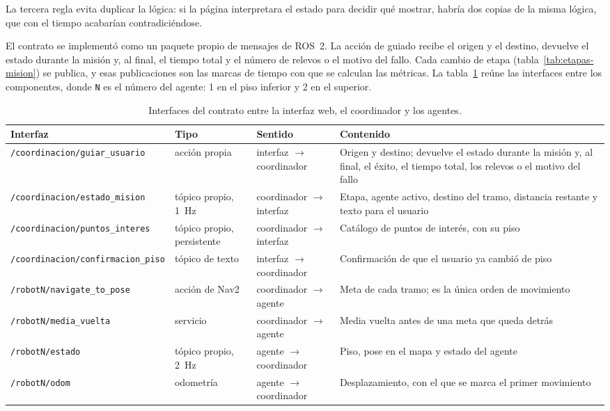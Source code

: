 La tercera regla evita duplicar la lógica: si la página interpretara el estado para decidir qué mostrar, habría dos copias de la misma lógica, que con el tiempo acabarían contradiciéndose.

El contrato se implementó como un paquete propio de mensajes de ROS~2. La acción
de guiado recibe el origen y el destino, devuelve el estado durante la misión y,
al final, el tiempo total y el número de relevos o el motivo del fallo. Cada
cambio de etapa (tabla~\ref{tab:etapas-mision}) se publica, y esas publicaciones
son las marcas de tiempo con que se calculan las métricas. La tabla~\ref{tab:contrato} reúne las interfaces entre los componentes, donde \texttt{N} es el número del agente: 1 en el piso inferior y 2 en el superior.

\begin{table}[H]
  \centering\footnotesize
  \caption{Interfaces del contrato entre la interfaz web, el coordinador y los agentes.}
  \label{tab:contrato}
  \begin{tabular}{@{}p{}p{}p{}p{}@{}}
    \toprule
    \textbf{Interfaz} & \textbf{Tipo} & \textbf{Sentido} & \textbf{Contenido} \\ \midrule
    \texttt{/coordinacion/guiar\_usuario} & acción propia & interfaz $\rightarrow$ coordinador & Origen y destino; devuelve el estado durante la misión y, al final, el éxito, el tiempo total, los relevos o el motivo del fallo \\ \addlinespace
    \texttt{/coordinacion/estado\_mision} & tópico propio, 1~Hz & coordinador $\rightarrow$ interfaz & Etapa, agente activo, destino del tramo, distancia restante y texto para el usuario \\ \addlinespace
    \texttt{/coordinacion/puntos\_interes} & tópico propio, persistente & coordinador $\rightarrow$ interfaz & Catálogo de puntos de interés, con su piso \\ \addlinespace
    \texttt{/coordinacion/confirmacion\_piso} & tópico de texto & interfaz $\rightarrow$ coordinador & Confirmación de que el usuario ya cambió de piso \\ \addlinespace
    \texttt{/robotN/navigate\_to\_pose} & acción de Nav2 & coordinador $\rightarrow$ agente & Meta de cada tramo; es la única orden de movimiento \\ \addlinespace
    \texttt{/robotN/media\_vuelta} & servicio & coordinador $\rightarrow$ agente & Media vuelta antes de una meta que queda detrás \\ \addlinespace
    \texttt{/robotN/estado} & tópico propio, 2~Hz & agente $\rightarrow$ coordinador & Piso, pose en el mapa y estado del agente \\ \addlinespace
    \texttt{/robotN/odom} & odometría & agente $\rightarrow$ coordinador & Desplazamiento, con el que se marca el primer movimiento \\ \bottomrule
  \end{tabular}
\end{table}

